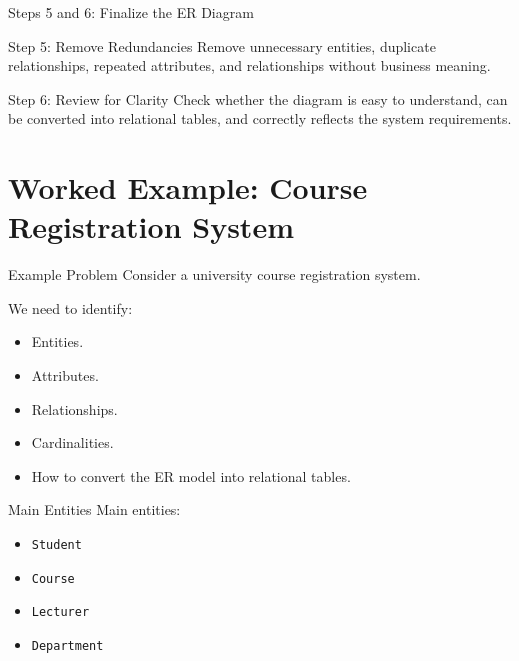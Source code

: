 \documentclass[aspectratio=169,11pt]{beamer}
\newcommand{\smallitem}{\setlength{\itemsep}{2pt}\setlength{\parskip}{0pt}}
\begin{document}
\begin{frame}{Steps 5 and 6: Finalize the ER Diagram}
\small
\begin{block}{Step 5: Remove Redundancies}
Remove unnecessary entities, duplicate relationships, repeated attributes, and relationships without business meaning.
\end{block}

\begin{block}{Step 6: Review for Clarity}
Check whether the diagram is easy to understand, can be converted into relational tables, and correctly reflects the system requirements.
\end{block}
\end{frame}

\section{Worked Example: Course Registration System}

\begin{frame}{Example Problem}
\small
Consider a university course registration system.

\vspace{2mm}
We need to identify:
\begin{itemize}
\smallitem
  \item Entities.
  \item Attributes.
  \item Relationships.
  \item Cardinalities.
  \item How to convert the ER model into relational tables.
\end{itemize}
\end{frame}

\begin{frame}{Main Entities}
\small
Main entities:
\begin{itemize}
\smallitem
  \item \texttt{Student}
  \item \texttt{Course}
  \item \texttt{Lecturer}
  \item \texttt{Department}
\end{itemize}
\end{frame}
\end{document}
